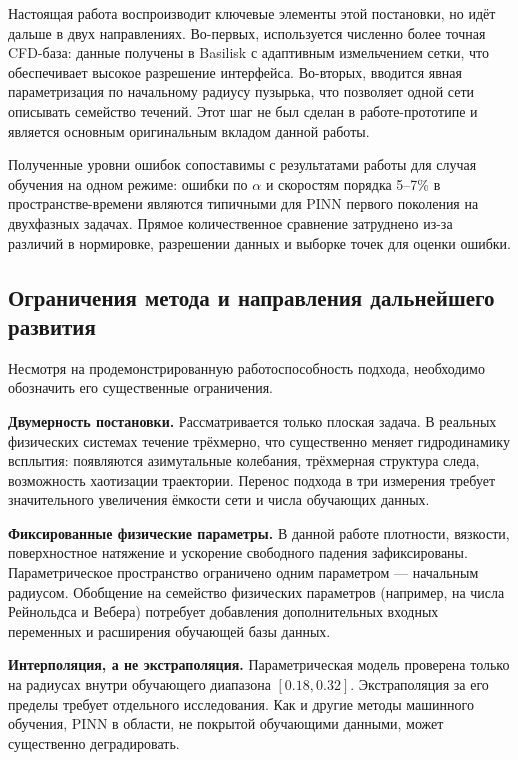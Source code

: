 \documentclass[12pt,a4paper]{article}
\begin{document}
Настоящая работа воспроизводит ключевые элементы этой постановки, но идёт
дальше в двух направлениях. Во-первых, используется численно более точная
CFD-база: данные получены в Basilisk с адаптивным измельчением сетки, что
обеспечивает высокое разрешение интерфейса. Во-вторых, вводится явная
параметризация по начальному радиусу пузырька, что позволяет одной сети
описывать семейство течений. Этот шаг не был сделан в работе-прототипе и
является основным оригинальным вкладом данной работы.

Полученные уровни ошибок сопоставимы с результатами работы \cite{Buhendwa2021}
для случая обучения на одном режиме: ошибки по \(\alpha\) и скоростям порядка
5--7\% в пространстве-времени являются типичными для PINN первого поколения на
двухфазных задачах. Прямое количественное сравнение затруднено из-за различий
в нормировке, разрешении данных и выборке точек для оценки ошибки.

\subsection{Ограничения метода и направления дальнейшего развития}

Несмотря на продемонстрированную работоспособность подхода, необходимо
обозначить его существенные ограничения.

\textbf{Двумерность постановки.} Рассматривается только плоская задача. В
реальных физических системах течение трёхмерно, что существенно меняет
гидродинамику всплытия: появляются азимутальные колебания, трёхмерная структура
следа, возможность хаотизации траектории. Перенос подхода в три измерения
требует значительного увеличения ёмкости сети и числа обучающих данных.

\textbf{Фиксированные физические параметры.} В данной работе плотности,
вязкости, поверхностное натяжение и ускорение свободного падения зафиксированы.
Параметрическое пространство ограничено одним параметром --- начальным радиусом.
Обобщение на семейство физических параметров (например, на числа Рейнольдса и
Вебера) потребует добавления дополнительных входных переменных и расширения
обучающей базы данных.

\textbf{Интерполяция, а не экстраполяция.} Параметрическая модель проверена
только на радиусах внутри обучающего диапазона \([0.18, 0.32]\). Экстраполяция
за его пределы требует отдельного исследования. Как и другие методы машинного
обучения, PINN в области, не покрытой обучающими данными, может существенно
деградировать.
\end{document}
